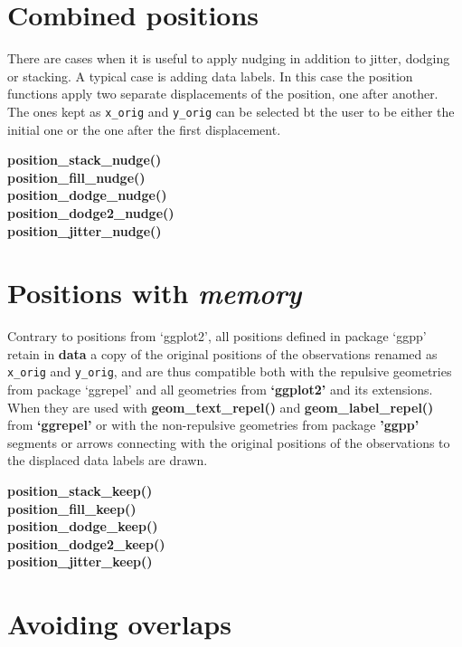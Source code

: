 \documentclass[DIV=21,a3,landscape,9pt]{scrartcl}\usepackage[]{graphicx}\usepackage[]{xcolor}
\begin{document}
\begin{multicols}{3}
\section*{Combined positions}

There are cases when it is useful to apply nudging in addition to jitter, dodging or stacking. A typical case is adding data labels. In this case the position functions apply two separate displacements of the position, one after another. The ones kept as \texttt{x\_orig} and \texttt{y\_orig} can be selected bt the user to be either the initial one or the one after the first displacement.\vspace{1ex}

\noindent
\textbf{position\_stack\_nudge()}\\
\textbf{position\_fill\_nudge()}\\
\textbf{position\_dodge\_nudge()}\\
\textbf{position\_dodge2\_nudge()}\\
\textbf{position\_jitter\_nudge()}\\

\section*{Positions with \textsl{memory}}

Contrary to positions from `ggplot2', all positions defined in package `ggpp' retain in \textbf{data} a copy of the original positions of the observations renamed as \texttt{x\_orig} and \texttt{y\_orig}, and are thus compatible both with the repulsive geometries from package `ggrepel' and all geometries from \textbf{`ggplot2'} and its extensions. When they are used with \textbf{geom\_text\_repel()} and \textbf{geom\_label\_repel()} from \textbf{`ggrepel'} or with the non-repulsive geometries from package \textbf{'ggpp'} segments or arrows connecting with the original positions of the observations to the displaced data labels are drawn.\vspace{1ex}

\noindent
\textbf{position\_stack\_keep()}\\
\textbf{position\_fill\_keep()}\\
\textbf{position\_dodge\_keep()}\\
\textbf{position\_dodge2\_keep()}\\
\textbf{position\_jitter\_keep()}\\

\section*{Avoiding overlaps}


\end{multicols}
\end{document}
